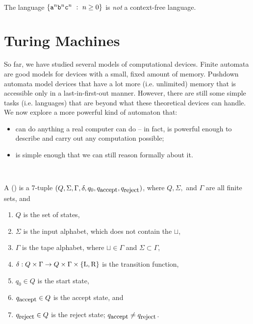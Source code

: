 \documentclass[twoside,letterpaper,openany]{book}
\begin{document}
~

\begin{thm3}
The language $\left\lbrace \texttt{a}^n \texttt{b}^n \texttt{c}^n\ :\  n \geq 0  \right\rbrace$ is \emph{not} a context-free language.
\end{thm3}






\chapter{Turing Machines}

So far, we have studied several models of computational devices. Finite automata are good models for devices with a small, fixed amount of memory. Pushdown automata model devices that have a lot more (i.e. unlimited) memory that is accessible only in a last-in-first-out manner. However, there are still some simple tasks (i.e. languages) that are beyond what these theoretical devices can handle. We now explore a more powerful kind of automaton that:

\begin{itemize}
\item can do anything a real computer can do -- in fact, is powerful enough to describe and carry out any computation possible;
\item is simple enough that we can still reason formally about it.
\end{itemize}

~

\newcommand\qaccept{q_\textrm{\small accept}}
\newcommand\qreject{q_\textrm{\small reject}}
\newcommand\blanksymbol\sqcup
\newcommand\tmL{\textrm{L}}
\newcommand\tmR{\textrm{R}}
\newcommand\tmS{\textrm{S}}


\begin{defn}
A  () is a 7-tuple $(Q, \Sigma, \Gamma, \delta, q_0, \qaccept,\qreject )$, where $Q, \Sigma,$ and $\Gamma$ are all finite sets, and
\begin{enumerate}
\item $Q$ is the set of states,
\item $\Sigma$ is the input alphabet, which does not contain the  $\blanksymbol$,
\item $\Gamma$ is the tape alphabet, where $\blanksymbol \in \Gamma$ and $\Sigma \subset \Gamma$,
\item $\delta: Q \times \Gamma \rightarrow Q \times \Gamma \times \setdef{\tmL, \tmR}$ is the transition function,
\item $q_0 \in Q$ is the start state,
\item $\qaccept \in Q$ is the accept state, and
\item $\qreject \in Q$ is the reject state; $\qaccept \neq \qreject$.
\end{enumerate}
\end{defn}
\end{document}
